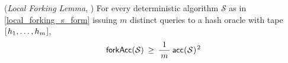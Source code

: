 \documentclass{iacrtrans}
\begin{document}
\begin{lem}\label{local_forking_lemma}
\textup{(\textit{Local Forking Lemma}, \cite{paper_bellare_local_forking})}
For every deterministic algorithm $\mathcal{S}$ as in
\eqref{local_forking_s_form} issuing $m$ distinct queries
to a hash oracle with tape
$[\hspace{0.75pt}h_1, \dots, h_{m}\hspace{0.75pt}]$,
\vspace{5pt}
\begin{equation}\label{local_forking_bound}
\mathsf{forkAcc}
	(
		\mathcal{S}
	)
	\hspace{2pt}
	\ge
	\hspace{2pt}
	\frac{1}{\hspace{2pt}m\hspace{2pt}}
	\hspace{2pt}
	\mathsf{acc}
	\hspace{0.3pt}
	(
		\hspace{0.3pt}
		\mathcal{S}
		\hspace{0.3pt}
	) ^ {\hspace{1pt}2}
\vspace{5pt}
\end{equation}
\end{lem}
\end{document}
